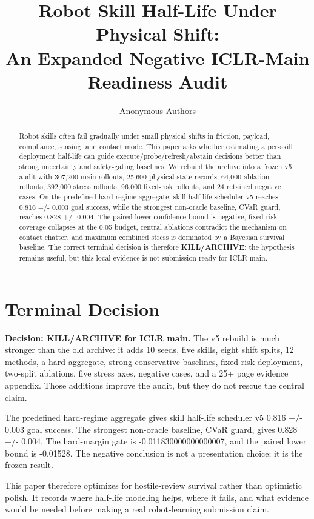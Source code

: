 \documentclass{article}
\title{Robot Skill Half-Life Under Physical Shift:\\An Expanded Negative ICLR-Main Readiness Audit}
\author{Anonymous Authors}
\newcommand{\methodname}{skill half-life scheduler v5}
\begin{document}
\maketitle

\begin{abstract}

Robot skills often fail gradually under small physical shifts in friction, payload, compliance, sensing, and contact mode. This paper asks whether estimating a per-skill deployment half-life can guide execute/probe/refresh/abstain decisions better than strong uncertainty and safety-gating baselines. We rebuild the archive into a frozen v5 audit with 307,200 main rollouts, 25,600 physical-state records, 64,000 ablation rollouts, 392,000 stress rollouts, 96,000 fixed-risk rollouts, and 24 retained negative cases. On the predefined hard-regime aggregate, \methodname{} reaches 0.816 +/- 0.003 goal success, while the strongest non-oracle baseline, CVaR guard, reaches 0.828 +/- 0.004. The paired lower confidence bound is negative, fixed-risk coverage collapses at the 0.05 budget, central ablations contradict the mechanism on contact chatter, and maximum combined stress is dominated by a Bayesian survival baseline. The correct terminal decision is therefore \textbf{KILL/ARCHIVE}: the hypothesis remains useful, but this local evidence is not submission-ready for ICLR main.

\end{abstract}

\section{Terminal Decision}

\textbf{Decision: KILL/ARCHIVE for ICLR main.} The v5 rebuild is much stronger than the old archive: it adds 10 seeds, five skills, eight shift splits, 12 methods, a hard aggregate, strong conservative baselines, fixed-risk deployment, two-split ablations, five stress axes, negative cases, and a 25+ page evidence appendix. Those additions improve the audit, but they do not rescue the central claim.

The predefined hard-regime aggregate gives \methodname{} 0.816 +/- 0.003 goal success. The strongest non-oracle baseline, CVaR guard, gives 0.828 +/- 0.004. The hard-margin gate is -0.011830000000000007, and the paired lower bound is -0.01528. The negative conclusion is not a presentation choice; it is the frozen result.

This paper therefore optimizes for hostile-review survival rather than optimistic polish. It records where half-life modeling helps, where it fails, and what evidence would be needed before making a real robot-learning submission claim.
\end{document}
